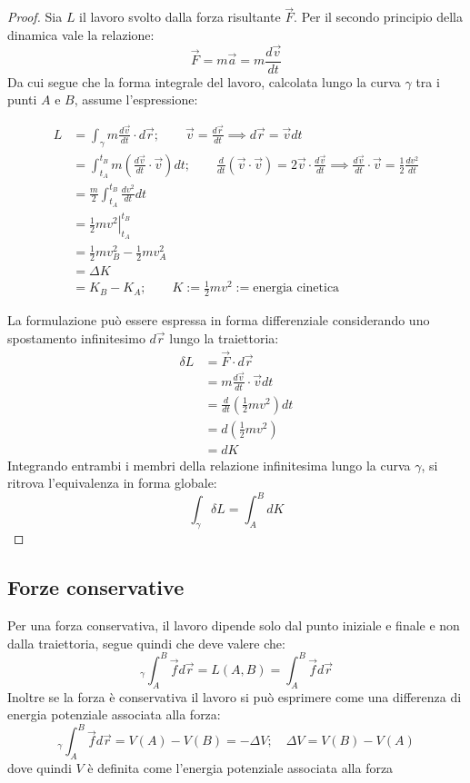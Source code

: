 \documentclass[11pt, a4paper, openright]{book}
\theoremstyle{plain}
\theoremstyle{definition}
\begin{document}
\begin{proof}
    Sia $L$ il lavoro svolto dalla forza risultante $\vec{F}$. Per il secondo principio della dinamica vale la relazione:
    \[ \vec{F} = m\vec{a} = m\frac{d\vec{v}}{dt} \]
    Da cui segue che la forma integrale del lavoro, calcolata lungo la curva $\gamma$ tra i punti $A$ e $B$, assume l'espressione:

    \begin{align}
        L & = \int_\gamma m \frac{d\vec{v}}{dt} \cdot d\vec{r}; \quad \quad \vec{v} = \frac{d\vec{r}}{dt} \implies d\vec{r} = \vec{v}dt \\ 
        & = \int_{t_A}^{t_B} m \left( \frac{d\vec{v}}{dt} \cdot \vec{v} \right) dt; \quad \quad \frac{d}{dt}(\vec{v} \cdot \vec{v}) = 2\vec{v} \cdot \frac{d\vec{v}}{dt} \implies \frac{d\vec{v}}{dt} \cdot \vec{v} = \frac{1}{2} \frac{dv^2}{dt} \\
        & = \frac{m}{2} \int_{t_A}^{t_B} \frac{dv^2}{dt}dt \\
        & = \left. \frac{1}{2}mv^2 \right|_{t_A}^{t_B} \\
        & = \frac{1}{2}m v_B^2 - \frac{1}{2}m v_A^2 \\
        & = \Delta K \\
        & = K_B - K_A; \quad \quad K := \frac{1}{2}mv^2 := \text{energia cinetica}
    \end{align}

    La formulazione può essere espressa in forma differenziale considerando uno spostamento infinitesimo $d\vec{r}$ lungo la traiettoria:
    \begin{align}
        \delta L & = \vec{F} \cdot d\vec{r} \\
                & = m \frac{d\vec{v}}{dt} \cdot \vec{v}dt \\ 
                & = \frac{d}{dt}\left(\frac{1}{2}mv^2\right)dt \\
                & = d\left(\frac{1}{2}mv^2\right) \\
                & = dK
    \end{align}
    Integrando entrambi i membri della relazione infinitesima lungo la curva $\gamma$, si ritrova l'equivalenza in forma globale:
    \[ \int_\gamma \delta L = \int_A^B dK \]
\end{proof}

\newpage

\subsection{Forze conservative}
Per una forza conservativa, il lavoro dipende solo dal punto iniziale e finale e non dalla traiettoria, segue quindi che deve valere che:
\[{}_\gamma\int_A^B \vec{f}d\vec{r} = L(A, B) = \int_A^B \vec{f}d\vec{r}\]
Inoltre se la forza è conservativa il lavoro si può esprimere come una differenza di energia potenziale associata alla forza:
\[{}_\gamma\int_A^B \vec{f}d\vec{r} = V(A) - V(B) = -\Delta V; \quad \Delta V = V(B) - V(A)\]
dove quindi $V$ è definita come l'energia potenziale associata alla forza
\end{document}
